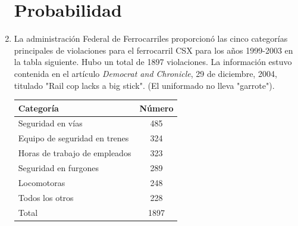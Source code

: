 \documentclass[10pt,twoside]{article}
\begin{document}
\begin{enumerate}
\section*{Probabilidad}
\item La administración Federal de Ferrocarriles proporcionó las cinco categorías principales de violaciones para el ferrocarril CSX para los años 1999-2003 en la tabla siguiente. Hubo un total de 1897 violaciones. La información estuvo contenida en el artículo \textit{Democrat and Chronicle}, 29 de diciembre, 2004, titulado "Rail cop lacks a big stick". (El uniformado no lleva "garrote").
\begin{tabular}{lc}
Categor\'{i}a & N\'{u}mero \\ 
\hline 
Seguridad en v\'{i}as & 485 \\ 
Equipo de seguridad en trenes & 324 \\ 
Horas de trabajo de empleados & 323 \\ 
Seguridad en furgones & 289 \\ 
Locomotoras & 248 \\ 
Todos los otros & 228 \\ 
\hline 
Total & 1897 \\ 
\end{tabular} 
\end{enumerate}
\end{document}
